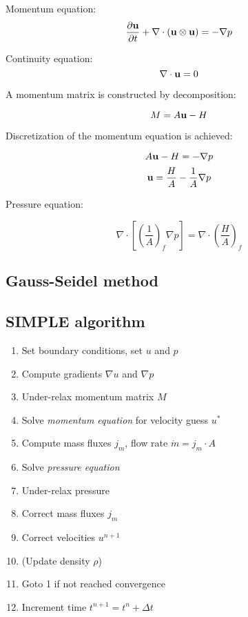 \documentclass[12pt]{article}
\newcommand{\lb}{\left(}
\newcommand{\rb}{\right)}
\newcommand{\vb}[1]{\text{\textbf{#1}}}
\begin{document}
Momentum equation:
$$
\frac{\partial \vb u}{\partial t} + \nabla \cdot (\vb u \otimes \vb u) = - \nabla p
$$

Continuity equation:
$$
\nabla \cdot \vb u = 0
$$

A momentum matrix is constructed by decomposition:

$$
M = A \vb u - H
$$

Discretization of the momentum equation is achieved:

$$
A \vb u - H = - \nabla p
$$
\begin{equation}
  \vb u = \frac{H}{A} - \frac{1}{A} \nabla p
\end{equation}

Pressure equation:

\begin{equation}
  \nabla \cdot \left [ \lb \frac{1}{A} \rb_f \nabla p \right] = \nabla \cdot \lb \frac{H}{A} \rb_f
\end{equation}

\subsection{Gauss-Seidel method}

\subsection{SIMPLE algorithm}

\begin{enumerate}
\item Set boundary conditions, set $u$ and $p$
\item Compute gradients $\nabla u$ and $\nabla p$
\item Under-relax momentum matrix $M$
\item Solve \textit{momentum equation} for velocity guess $u^*$
\item Compute mass fluxes $j_m$, flow rate $\dot m = j_m \cdot A$
\item Solve \textit{pressure equation}
\item Under-relax pressure
\item Correct mass fluxes $j_m$
\item Correct velocities $u^{n+1}$
\item (Update density $\rho$)
\item Goto 1 if not reached convergence
\item Increment time $t^{n+1} = t^n + \Delta t$
\end{enumerate}
\end{document}
